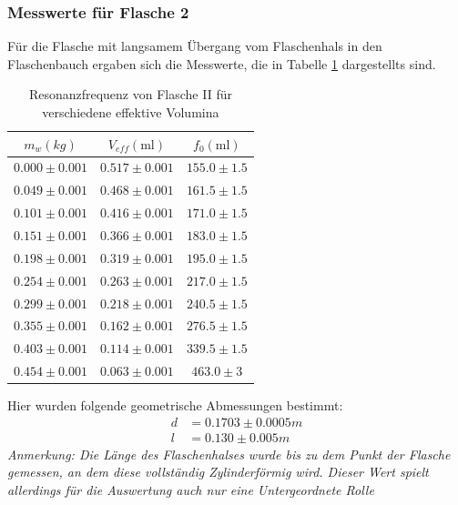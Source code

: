 \documentclass{report}
\begin{document}
\subsubsection{Messwerte für Flasche 2}
Für die Flasche mit langsamem Übergang vom Flaschenhals in den Flaschenbauch ergaben sich die Messwerte, die in Tabelle \ref{tab:HelmholtzFreq2} dargestellts sind. 
\begin{table}[H]
    \centering
    \caption{Resonanzfrequenz von Flasche II für verschiedene effektive Volumina}
    \label{tab:HelmholtzFreq2}
    \begin{tabular}{c c c}
        \hline
        $m_w (kg)$ &  $V_{eff}(\si{\ml})$ & $f_0(\si{\ml})$ \\
        \hline
        $0.000 \pm 0.001$ & $0.517 \pm 0.001$ &  $155.0 \pm 1.5$\\
        $0.049 \pm 0.001$ & $0.468 \pm 0.001$ &  $161.5 \pm 1.5$\\
        $0.101 \pm 0.001$ & $0.416 \pm 0.001$ &  $171.0 \pm 1.5$\\
        $0.151 \pm 0.001$ & $0.366 \pm 0.001$ &  $183.0 \pm 1.5$\\
        $0.198 \pm 0.001$ & $0.319 \pm 0.001$ &  $195.0 \pm 1.5$\\
        $0.254 \pm 0.001$ & $0.263 \pm 0.001$ &  $217.0 \pm 1.5$\\
        $0.299 \pm 0.001$ & $0.218 \pm 0.001$ &  $240.5 \pm 1.5$\\
        $0.355 \pm 0.001$ & $0.162 \pm 0.001$ &  $276.5 \pm 1.5$\\
        $0.403 \pm 0.001$ & $0.114 \pm 0.001$ &  $339.5 \pm 1.5$\\
        $0.454 \pm 0.001$ & $0.063 \pm 0.001$ &  $463.0 \pm 3$\\
        \hline
    \end{tabular}
\end{table}
Hier wurden folgende geometrische Abmessungen bestimmt:
\begin{equation}
    \begin{split}
        d &= 0.1703 \pm 0.0005 m \\
        l &= 0.130 \pm 0.005 m
    \end{split}
\end{equation}
\textit{Anmerkung: Die Länge des Flaschenhalses wurde bis zu dem Punkt der Flasche gemessen, an dem diese vollständig Zylinderförmig wird. Dieser Wert spielt allerdings
für die Auswertung auch nur eine Untergeordnete Rolle}
\end{document}
